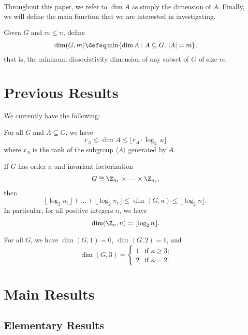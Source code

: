 \documentclass[ml]{sdoc}
\begin{document}
Throughout this paper, we refer to $\dim A$ as simply the dimension of $A$. Finally, we will define the main function that we are interested in investigating.

\begin{definition}
Given $G$ and $m\leq n$, define
    \[\dim(G,m)\defeq\min \{\dim A\mid A \subseteq G,\, |A|=m\};\]
    that is, the minimum dissociativity dimension of any subset of $G$ of size $m$.
\end{definition}

\section{Previous Results}

We currently have the following:

\begin{theorem}\label{F.188}
    For all $G$ and $A\subseteq G$, we have
    \[r_A\leq \dim A\leq \lfloor r_A\cdot\log_2\,\kappa\rfloor\]
    where $r_A$ is the rank of the subgroup $\langle A\rangle$ generated by $A$.
\end{theorem}

\begin{proposition}\label{nr}
    If $G$ has order $n$ and invariant factorization
    \[G\cong\Z_{n_1}\times\cdots\times\Z_{n_r},\]
    then
    \[\lfloor\log_2 n_1\rfloor+\ldots+\lfloor\log_2 n_r\rfloor\leq\dim(G,n)\leq\lfloor\log_2 n\rfloor.\]
    In particular, for all positive integers $n$, we have
    \[\dim(\Z_n,n)=\lfloor\log_2 n\rfloor.\]
\end{proposition}

\begin{proposition}\label{123}
    For all $G$, we have $\dim(G, 1)=0$, $\dim(G, 2)=1$, and
    \[\dim(G, 3) = \begin{cases}1 & \text{if $\kappa\geq3$;} \\ 2 & \text{if $\kappa=2$.}\end{cases}\]
\end{proposition}

\section{Main Results}

\subsection*{Elementary Results}
\end{document}
